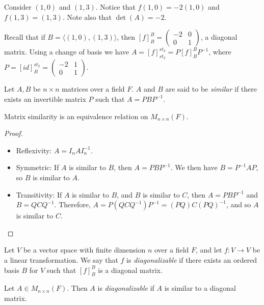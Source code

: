 \begin{exmp}
    Consider $(1, 0)$ and $(1, 3)$. Notice that $f(1, 0) = -2(1, 0)$ and $f(1, 3) = (1, 3)$. Note also that $\det(A) = -2$.

    Recall that if $B = \langle (1, 0), (1, 3)\rangle$, then $[f]_{B}^{B} = \begin{pmatrix}
        -2 & 0 \\ 0 & 1
    \end{pmatrix}$, a diagonal matrix. Using a change of basis we have $A = [f]_{st_2}^{st_2} = P[f]_{B}^{B}P^{-1}$, where $P = [id]_{B}^{st_2} = \begin{pmatrix}
        -2 & 1 \\ 0 & 1
    \end{pmatrix}$.
\end{exmp}

\begin{defn}
    Let $A, B$ be $n \times n$ matrices over a field $F$. $A$ and $B$ are said to be \emph{similar} if there exists an invertible matrix $P$ such that $A = PBP^{-1}$.
\end{defn}

\begin{lemma}
    Matrix similarity is an equivalence relation on $M_{n \times n}(F)$.
\end{lemma}

\begin{proof}\proofbreak
    \begin{itemize}
        \item Reflexivity: $A = I_nAI_n^{-1}$.
        \item Symmetric: If $A$ is similar to $B$, then $A = PBP^{-1}$. We then have $B = P^{-1}AP$, so $B$ is similar to $A$.
        \item Transitivity: If $A$ is similar to $B$, and $B$ is similar to $C$, then $A = PBP^{-1}$ and $B = QCQ^{-1}$. Therefore, $A = P(QCQ^{-1})P^{-1} = (PQ)C(PQ)^{-1}$, and so $A$ is similar to $C$.
    \end{itemize}
\end{proof}

\begin{defn}
    Let $V$ be a vector space with finite dimension $n$ over a field $F$, and let $f: V \to V$ be a linear transformation. We say that $f$ is \emph{diagonalizable} if there exists an ordered basis $B$ for $V$ such that $[f]_{B}^{B}$ is a diagonal matrix.

    Let $A \in M_{n\times n}(F)$. Then $A$ is \emph{diagonalizable} if $A$ is similar to a diagonal matrix.
\end{defn}


